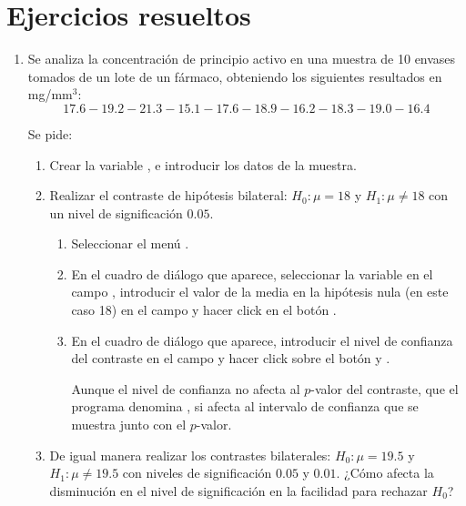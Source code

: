\section{Ejercicios resueltos}
\begin{enumerate}[leftmargin=*]

\item  Se analiza la concentración de principio activo en una
muestra de 10 envases tomados de un lote de un fármaco, obteniendo
los siguientes resultados en mg/mm$^{3}$:
\[
17.6-19.2-21.3-15.1-17.6-18.9-16.2-18.3-19.0-16.4
\]

Se pide:

\begin{enumerate}
\item  Crear la variable , e introducir los
datos de la muestra.

\item Realizar el contraste de hipótesis bilateral: $H_0:
\mu=18$ y $H_1:\mu\neq18$ con un nivel de significación $0.05$.
\begin{indicacion}
\begin{enumerate}
\item Seleccionar el menú .
\item En el cuadro de diálogo que aparece, seleccionar la variable  en el  campo , introducir el valor de la media en la hipótesis nula (en este caso 18) en el campo  y
hacer click en el botón .
\item En el cuadro de diálogo que aparece, introducir el nivel de confianza del contraste en el campo  y hacer click sobre el botón  y .

Aunque el nivel de confianza no afecta al $p$-valor del contraste, que el programa denomina ,
si afecta al intervalo de confianza que se muestra junto con el $p$-valor.
\end{enumerate}
\end{indicacion}

\item De igual manera realizar los contrastes bilaterales: $H_0:
\mu=19.5$ y $H_1:\mu\neq19.5$ con niveles de significación
$0.05$ y $0.01$. ¿Cómo afecta la disminución en el nivel de
significación en la facilidad para rechazar $H_0$?


\end{enumerate}
\end{enumerate}
